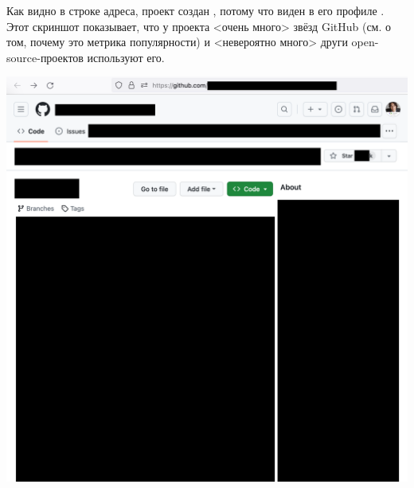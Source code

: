 
Как видно в строке адреса, проект создан \MrIeeeReferenceOne,
потому что  виден в его профиле .
Этот скриншот показывает, что у проекта <очень много> звёзд GitHub
(см.  о том, почему это метрика популярности)
и <невероятно много> други open-source-проектов используют его.

\begin{center}
    \includegraphics[width=37em]{ieee-reference-one-project-one-github-p1_public}
\end{center}
\WillContinue
\pagebreak

